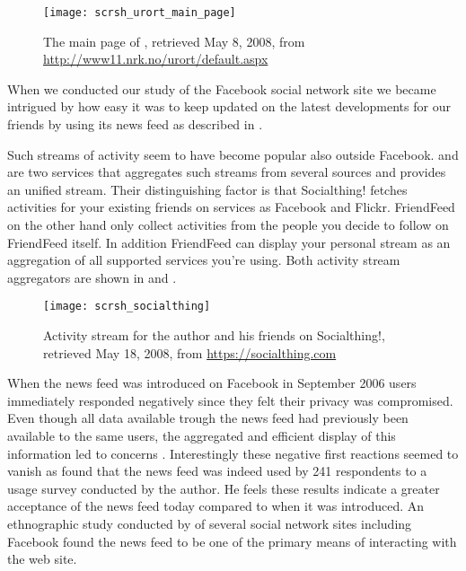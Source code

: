 \begin{figure}
  \begin{whole}
    \texttt{[image: scrsh\_urort\_main\_page]}
    \caption[\urort{} Main Page]{
      The main page of \urort{},
      retrieved May 8, 2008, from
      \url{http://www11.nrk.no/urort/default.aspx}
    }
    \label{figure:scrsh.urort.main.page}
  \end{whole}
\end{figure}

When we conducted our study of the Facebook social network site we became
intrigued by how easy it was to keep updated on the latest developments for
our friends by using its news feed as described in
. 

Such streams of activity seem to have become popular also outside Facebook.
 and  are two services that
aggregates such streams from several sources and provides an unified stream.
Their distinguishing factor is that Socialthing! fetches activities for your
existing friends on services as Facebook and Flickr. FriendFeed on the other
hand only collect activities from the people you decide to follow on
FriendFeed itself. In addition FriendFeed can display your personal stream
as an aggregation of all supported services you're using. Both activity stream
aggregators are shown in  and
.

\begin{figure}
  \begin{whole}
    \texttt{[image: scrsh\_socialthing]}
    \caption[Socialthing! Activity Stream]{
      Activity stream for the author and his friends on Socialthing!,
      retrieved May 18, 2008, from
      \url{https://socialthing.com}
    }
    \label{figure:scrsh.socialthing}
  \end{whole}
\end{figure}

When the news feed was introduced on Facebook in September 2006 users
immediately responded negatively since they felt their privacy was
compromised. Even though all data available trough the news feed had
previously been available to the same users, the aggregated and efficient
display of this information led to concerns \citep[]{boyd08}. 
Interestingly these negative first reactions seemed to vanish as
\citet[]{joinson08} found that the news feed was indeed used by
241 respondents to a usage survey conducted by the author. He feels these
results indicate a greater acceptance of the news feed today compared to when
it was introduced. An ethnographic study conducted by
\citet[]{chapman08} of several social network sites
including Facebook found the news feed to be one of the primary means of
interacting with the web site.

